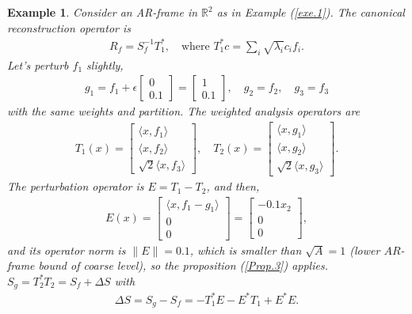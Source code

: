 \documentclass[12pt,titlepage]{amsart}
\newtheorem{exam}[thm]{Example}
\theoremstyle{definition}
\theoremstyle{remark}
\begin{document}
\begin{exam}
Consider an AR-frame in $\mathbb{R}^2$ as in Example
(\ref{exe.1}). The canonical reconstruction operator is
\begin{eqnarray*}
R_f = S_f^{-1} T_1^*, \quad \text{where } T_1^* c = \sum_i
\sqrt{\lambda_i} c_i f_i.
\end{eqnarray*}
Let's perturb $f_1$ slightly,
\begin{eqnarray*}
g_1 = f_1 + \epsilon
\begin{bmatrix} 0 \\ 0.1 \end{bmatrix} = \begin{bmatrix} 1 \\
0.1\end{bmatrix}, \quad g_2 = f_2, \quad g_3 = f_3
\end{eqnarray*}
with the same weights and partition. The weighted analysis
operators are
\begin{eqnarray*}
T_1(x) =
\begin{bmatrix} \langle x,f_1\rangle \\ \langle x,f_2\rangle \\
\sqrt{2}\langle x,f_3\rangle \end{bmatrix}, \quad T_2(x) =
\begin{bmatrix} \langle x,g_1\rangle \\ \langle x,g_2\rangle \\
\sqrt{2}\langle x,g_3\rangle
\end{bmatrix}.
\end{eqnarray*}
The perturbation operator is $E = T_1 - T_2 $, and then,
\begin{eqnarray*}
E(x) =
\begin{bmatrix} \langle x,f_1 - g_1\rangle \\ 0 \\ 0 \end{bmatrix}
= \begin{bmatrix} -0.1 x_2 \\ 0 \\ 0
\end{bmatrix},
\end{eqnarray*}
and its operator norm is $\|E\| = 0.1$, which is smaller than
$\sqrt{A} = 1$ (lower $AR$-frame bound of coarse level), so the
proposition (\ref{Prop.3}) applies. $S_g = T_2^* T_2 = S_f +
\Delta S$ with
\begin{eqnarray*}
\Delta S = S_g - S_f = - T_1^* E - E^* T_1 + E^* E.
\end{eqnarray*}

\end{exam}
\end{document}

